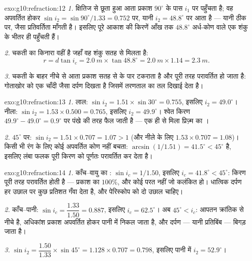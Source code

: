 \begin{solution}{exo:g10:refraction:12}
\emph{1.} क्षितिज से छूता हुआ आता प्रकाश $90^\circ$ के पास $i_1$ पर
पहुँचता है; वह अपवर्तित होकर $\sin i_2 = \sin 90^\circ / 1.33 = 0.752$ पर, यानी $i_2 = 48.8^\circ$ पर आता है ---
यानी ठीक  पर, जैसा प्रतिवर्तिता माँगती है। इसलिए
पूरे आकाश की किरणें आँख तक $48.8^\circ$ अर्ध-कोण वाले एक शंकु के भीतर ही
पहुँचती हैं।

\emph{2.} चकती का किनारा वहीं है जहाँ वह शंकु सतह से मिलता है:
\[
r = d \tan i_c = \qty{2.0}{m} \times \tan 48.8^\circ
= \qty{2.0}{m} \times 1.14 = \qty{2.3}{m}.
\]

\emph{3.} चकती के बाहर नीचे से आता प्रकाश सतह से 
के पार टकराता है और पूरी तरह परावर्तित हो जाता है: गोताखोर को एक चाँदी
जैसा दर्पण दिखता है जिसमें तरणताल का तल दिखाई देता है।
\end{solution}

\begin{solution}{exo:g10:refraction:13}
\emph{1.} लाल: $\sin i_2 = 1.51 \times \sin 30^\circ = 0.755$, इसलिए $i_2 = 49.0^\circ$। नीला: $\sin i_2 = 1.53 \times 0.500 = 0.765$, इसलिए $i_2 = 49.9^\circ$। श्वेत
किरण $49.9^\circ - 49.0^\circ = 0.9^\circ$ पर पंखे की तरह फैल जाती है --- एक ही  से
मिला प्रिज़्म का ।

\emph{2.} $45^\circ$ पर: $\sin i_2 = 1.51 \times 0.707 = 1.07 > 1$ (और नीले के लिए $1.53 \times 0.707 = 1.08$)। किसी भी रंग के
लिए कोई अपवर्तित कोण नहीं बचता:  $\arcsin(1/1.51) = 41.5^\circ < 45^\circ$ है, इसलिए
लंबा फलक पूरी किरण को पूर्णतः परावर्तित कर देता है।
\end{solution}

\begin{solution}{exo:g10:refraction:14}
\emph{1.} काँच--वायु का : $\sin i_c = 1/1.50$, इसलिए $i_c = 41.8^\circ < 45^\circ$:
किरण पूरी तरह परावर्तित होती है --- प्रकाश का $100\%$, और कोई परत नहीं
जो कलंकित हो। धात्विक दर्पण हर उछाल पर कुछ प्रतिशत गँवा देता है, और
पेरिस्कोप को दो उछाल चाहिए।

\emph{2.} काँच--पानी: $\sin i_c = \dfrac{1.33}{1.50} = 0.887$, इसलिए $i_c = 62.5^\circ$। अब $45^\circ < i_c$: आपतन क्रांतिक
से नीचे है, अधिकांश प्रकाश अपवर्तित होकर पानी में निकल जाता है, और
दर्पण --- यानी प्रतिबिंब --- बिगड़ जाता है।

\emph{3.} $\sin i_2 = \dfrac{1.50}{1.33} \times \sin 45^\circ
= 1.128 \times 0.707 = 0.798$, इसलिए पानी में $i_2 = 52.9^\circ$।
\end{solution}

